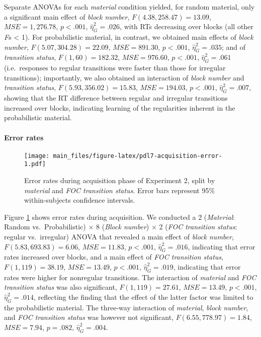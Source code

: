\documentclass[english,,man]{apa6}
\begin{document}
Separate ANOVAs for each \emph{material} condition yielded,
for random material, only a significant main effect of \emph{block number},
\(F(4.38, 258.47) = 13.09\), \(\mathit{MSE} = 1,276.78\), \(p < .001\), \(\hat{\eta}^2_G = .026\),
with RTs decreasing over blocks (all other \emph{F}s \textless{} 1).
For probabilistic material, in contrast, we obtained main effects of \emph{block number},
\(F(5.07, 304.28) = 22.09\), \(\mathit{MSE} = 891.30\), \(p < .001\), \(\hat{\eta}^2_G = .035\);
and of \emph{transition status},
\(F(1, 60) = 182.32\), \(\mathit{MSE} = 976.60\), \(p < .001\), \(\hat{\eta}^2_G = .061\) (i.e.~responses to regular transitions were faster than those for irregular transitions);
importantly, we also obtained an interaction of \emph{block number} and \emph{transition status},
\(F(5.93, 356.02) = 15.83\), \(\mathit{MSE} = 194.03\), \(p < .001\), \(\hat{\eta}^2_G = .007\),
showing that the RT difference between regular and irregular transitions increased over blocks, indicating learning of the regularities inherent in the probabilistic material.

\hypertarget{error-rates-1}{%
\paragraph{Error rates}\label{error-rates-1}}

\begin{figure}
\centering
\texttt{[image: main\_files/figure-latex/pdl7-acquisition-error-1.pdf]}
\caption{\label{fig:pdl7-acquisition-error}Error rates during acquisition phase of Experiment 2, split by \emph{material} and \emph{FOC transition status}. Error bars represent 95\% within-subjects confidence intervals.}
\end{figure}

Figure \ref{fig:pdl7-acquisition-error} shows error rates during acquisition.
We conducted a 2 (\emph{Material}: Random vs.~Probabilistic) \(\times\) 8 (\emph{Block number}) \(\times\) 2 (\emph{FOC transition status}: regular vs.~irregular) ANOVA that revealed
a main effect of \emph{block number},
\(F(5.83, 693.83) = 6.06\), \(\mathit{MSE} = 11.83\), \(p < .001\), \(\hat{\eta}^2_G = .016\),
indicating that error rates increased over blocks,
and a main effect of \emph{FOC transition status},
\(F(1, 119) = 38.19\), \(\mathit{MSE} = 13.49\), \(p < .001\), \(\hat{\eta}^2_G = .019\),
indicating that error rates were higher for nonregular transitions.
The interaction of \emph{material} and \emph{FOC transition status} was also significant,
\(F(1, 119) = 27.61\), \(\mathit{MSE} = 13.49\), \(p < .001\), \(\hat{\eta}^2_G = .014\), reflecting the finding that the effect of the latter factor was limited to the probabilistic material.
The three-way interaction of \emph{material}, \emph{block number}, and \emph{FOC transition status} was however not significant,
\(F(6.55, 778.97) = 1.84\), \(\mathit{MSE} = 7.94\), \(p = .082\), \(\hat{\eta}^2_G = .004\).
\end{document}
